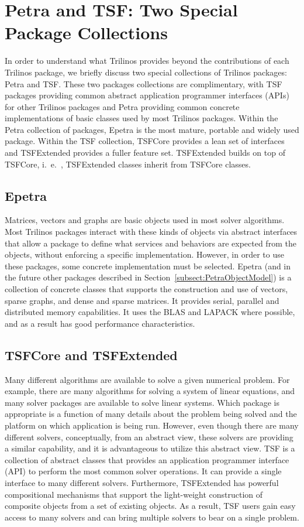 \documentclass[12pt,relax]{TrilinosOverview}
\begin{document}
\section{Petra and TSF: Two Special Package Collections}
\label{sect:PetraAndTSF}
In order to understand what Trilinos provides beyond the
contributions of each Trilinos package, we briefly discuss two special
collections of
Trilinos packages: Petra and TSF.  These two packages collections are
complimentary, with TSF packages providing common abstract application
programmer interfaces (APIs) for other Trilinos packages and Petra
providing common concrete implementations of basic classes used by most
Trilinos packages.  Within the Petra collection of packages, Epetra is
the most mature, portable and widely used package.  Within the TSF
collection, TSFCore provides a lean set of interfaces and TSFExtended
provides a fuller feature set.  TSFExtended builds on top of TSFCore,
i.~e.~, TSFExtended classes inherit from TSFCore classes.

\subsection{Epetra}
Matrices, vectors and graphs are basic objects used in most solver
algorithms. Most Trilinos
packages interact with these kinds of objects via abstract interfaces that
allow a package to define what services and behaviors are expected from 
the objects,
without enforcing a specific implementation.  However, in order to use
these packages, some concrete
implementation must be selected.  Epetra (and in the future other 
packages described
in Section~\ref{subsect:PetraObjectModel}) is a collection of concrete
classes that supports the construction and use of vectors, sparse
graphs, and dense and sparse matrices.  It provides serial, parallel and
 distributed memory
capabilities.  It uses the BLAS and LAPACK where possible, and as a
result has good performance characteristics.

\subsection{TSFCore and TSFExtended}
\label{subsect:InteropTSF}
Many different algorithms are available to solve a given numerical
problem.  For example, there are many algorithms for solving a system
of linear equations, and many solver packages are available to solve
linear systems.  Which package is appropriate is a function of
many details about the problem being solved and the platform on which
application is being run. However, even though
there are many different solvers, conceptually, from an abstract view,
these solvers are providing a similar capability, and it is
advantageous to utilize this abstract view.
TSF is a collection of abstract classes that provides an application
programmer interface (API) to perform the most common solver
operations.  It can provide a single interface to many different
solvers.  Furthermore, TSFExtended has powerful compositional
mechanisms that support the
light-weight construction of composite objects from a set of
existing objects.  As a result, TSF users gain easy access to many
solvers and can bring multiple solvers to bear on a single problem.
\end{document}
